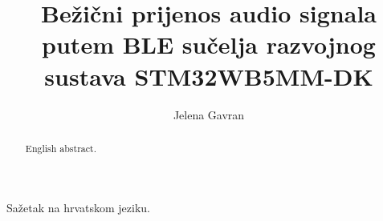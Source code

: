\documentclass[times, utf8, zavrsni]{fer}
\begin{document}

\title{Bežični prijenos audio signala putem BLE sučelja razvojnog sustava STM32WB5MM-DK}

\author{Jelena Gavran}

\maketitle


\zahvala{}

\tableofcontents

\begingroup
\renewcommand*\listfigurename{Indeks slika}
\renewcommand*\lstlistlistingname{Indeks odsječaka koda}
\listoffigures
\lstlistoflistings
\endgroup







{}


\begin{sazetak}
Sažetak na hrvatskom jeziku.

\end{sazetak}

\begin{abstract}
English abstract. 

\end{abstract}
\end{document}
